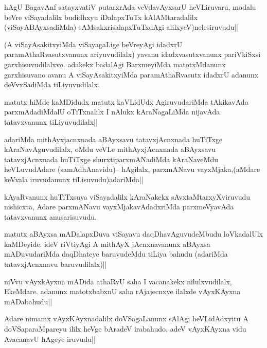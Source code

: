 \begin{artha}
hAgU BagavAnf satayxvatiV putarxrAda veVdavAyxsarU heVLiruvaru, modalu beVre viSayadalilx budidhxyu iDalapxTuTx kAlAMtaradalilx (viSayABAyxsadiMda) sAMsakxrisalapxTuTxdAgi alilxyeV)nelesiruvudu||
\end{artha}

\begin{artha}
(A viSayAsakitxyiMda viSayagaLige beVreyAgi idadxrU paramAthaRvasutxvanunx ariyuvudilalx) yavanu idadxvasutxvanunx pariVkiSxsi garxhisuvudilalxvo. adakekx badalAgi BarxmeyiMda matotxMdanunx garxhisuvano avanu A viSayAsakitxyiMda paramAthaRvasutx idadxrU adanunx deVvxSadiMda tiLiyuvudilalx.
\end{artha}

\begin{artha}
matutx hiMde kaMDidudx matutx kaVLidUdx AgiruvudariMda tAkikavAda parxmAdadiMdalU oTiTxnalilx I nAlukx kAraNagaLiMda nijavAda tatavxvanunx tiLiyuvudilalx||
\end{artha}

\begin{artha}
adariMda mithAyxjacnxnada aBAyxsavu tatavxjAcnxnada huTiTxge kAraNavAguvudilalx, oMdu veVLe mithAyxjAcnxnada aBAyxsavu tatavxjAcnxnada huTiTxge shurxtiparxmANadiMda kAraNaveMdu heVLuvudAdare (samAdhAnavidu)-- hAgilalx, parxmANavu vayxMjaka,(aMdare keVvala iruvudanunx tiLisuvudu)adariMda||
\end{artha}

\begin{artha}
kAyaRvanunx huTiTxsuva viSayadalilx kAraNakekx sAvxtaMtarxyXviruvudu nishicxta, Adare parxmANavu vayxMjakavAdadxriMda parxmeVyavAda tatavxvanunx anusarisuvudu.
\end{artha}

\begin{artha}
matutx aBAyxsa mADalapxDuva viSayavu daqDhavAguvudeMbudu loVkadalUlx kaMDeyide. ideV riVtiyAgi A mithAyX jAcnxnavanunx aBAyxsa mADuvudariMda daqDhateye baruvudeMdu tiLiya bahudu (adariMda tatavxjAcnxnavu baruvudilalx)||
\end{artha}

\begin{artha}
niVvu vAyxkAyxna mADida athaRvU saha I vacanakekx nilulxvudilalx, EkeMdare. adanunx matotxbabxnU  saha rAjajecnxye ilalxde vAyxKAyxna mADabahudu||
\end{artha}

\begin{artha}
Adare nimamx vAyxKAyxnadalilx doVSagaLanunx sAlAgi heVLidAdxyitu A doVSaparaMpareyu ililx heVge bAradeV irabahudo, adeV vAyxKAyxna vidu  AvacanavU hAgeye iruvudu||
\end{artha}


